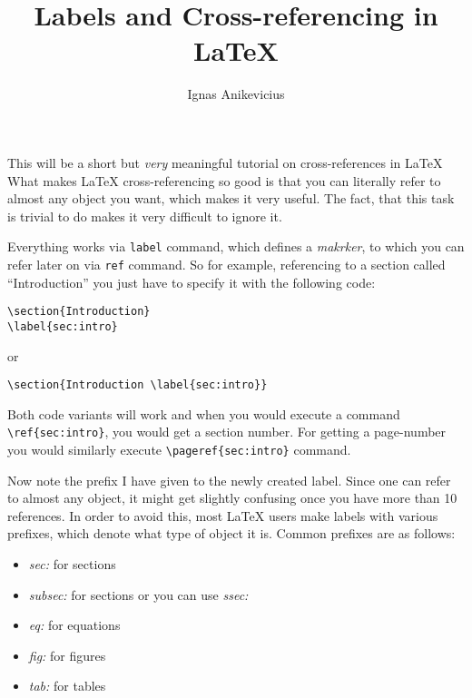 


\title{Labels and Cross-referencing in \LaTeX{}}
\author{Ignas Anikevicius}



\maketitle

This will be a short but \emph{very} meaningful tutorial on cross-references in
\LaTeX{}
%
What makes \LaTeX{} cross-referencing so good is that you can literally refer to
    almost any object you want, which makes it very useful.
%
The fact, that this task is trivial to do makes it very difficult to ignore it.

%    
Everything works via \verb|label| command, which defines a \emph{makrker}, to
    which you can refer later on via \verb|ref| command.
%
So for example, referencing to a section called ``Introduction'' you just have
    to specify it with the following code:
%
\begin{lstlisting}
\section{Introduction}
\label{sec:intro}
\end{lstlisting}
%
or
%
\begin{lstlisting}
\section{Introduction \label{sec:intro}}
\end{lstlisting}
%
Both code variants will work and when you would execute a command
    \verb|\ref{sec:intro}|, you would get a section number.
%
For getting a page-number you would similarly execute 
    \verb|\pageref{sec:intro}| command.

%
Now note the prefix I have given to the newly created label.
%
Since one can refer to almost any object, it might get slightly confusing once
    you have more than 10 references.
%
In order to avoid this, most \LaTeX{} users make labels with various prefixes,
    which denote what type of object it is.
%
Common prefixes are as follows:
%
\begin{itemize}
    \item \emph{sec:} for sections
    \item \emph{subsec:} for sections or you can use \emph{ssec:}
    \item \emph{eq:} for equations
    \item \emph{fig:} for figures
    \item \emph{tab:} for tables
\end{itemize}

